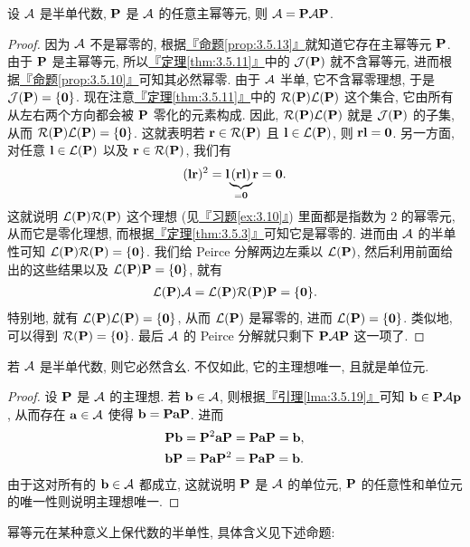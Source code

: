 \documentclass[lang=cn,zihao=-4,twoside,fontset=none]{textbook}
\newcommand{\undernote}[2]{\underset{#1}{\underbrace{#2}}}
\def\eq#1{\[\begin{aligned}{}#1\end{aligned}\]}
\newcommand{\propref}[1]{\hyperref[#1]{『命题\textnormal{\ref*{#1}}』}}
\newcommand{\thmref}[1]{\hyperref[#1]{『定理\textnormal{\ref*{#1}}』}}
\newcommand{\lmaref}[1]{\hyperref[#1]{『引理\textnormal{\ref*{#1}}』}}
\newcommand{\exref}[1]{\hyperref[#1]{『习题\textnormal{\ref*{#1}}』}}
\newcommand{\set}[1]{\{#1\}}
\newcommand{\bfnull}{\mathbf{0}}
\begin{document}
\begin{lem}
    \label{lma:3.5.19}%
    设 ${\mathcal A}$ 是半单代数, ${\mathbf P}$ 是 ${\mathcal A}$ 的任意主幂等元, 则 ${\mathcal A}={\mathbf P}{\mathcal A}{\mathbf P}$.
\end{lem}
\begin{proof}
    因为 ${\mathcal A}$ 不是幂零的, 根据\propref{prop:3.5.13}就知道它存在主幂等元 ${\mathbf P}$. 由于 ${\mathbf P}$ 是主幂等元, 所以\thmref{thm:3.5.11}中的 ${\mathcal J}({\mathbf P})$ 就不含幂等元, 进而根据\propref{prop:3.5.10}可知其必然幂零. 由于 ${\mathcal A}$ 半单, 它不含幂零理想, 于是 $\mJ(\bfP)=\set{\bfnull}$. 现在注意\thmref{thm:3.5.11}中的 ${\mathcal R}({\mathbf P}){\mathcal L}({\mathbf P})$ 这个集合, 它由所有从左右两个方向都会被 ${\mathbf P}$ 零化的元素构成. 因此, ${\mathcal R}({\mathbf P}){\mathcal L}({\mathbf P})$ 就是 ${\mathcal J}({\mathbf P})$ 的子集, 从而 $\mR(\bfP)\mL(\bfP)=\set{\bfnull}$. 这就表明若 ${\mathbf r}\in{\mathcal R}({\mathbf P})$ 且 ${\mathbf l}\in{\mathcal L}({\mathbf P})$, 则 $\bfr\bfl=\bfnull$. 另一方面, 对任意 ${\mathbf l}\in{\mathcal L}({\mathbf P})$ 以及 ${\mathbf r}\in{\mathcal R}({\mathbf P})$, 我们有 
    \eq{
        (\bfl\bfr)^2=\bfl\undernote{=\bfnull}{(\bfr\bfl)}\bfr=\bfnull.
    }
    这就说明 ${\mathcal L}({\mathbf P}){\mathcal R}({\mathbf P})$ 这个理想 (见\exref{ex:3.10}) 里面都是指数为 $2$ 的幂零元, 从而它是零化理想, 而根据\thmref{thm:3.5.3}可知它是幂零的. 进而由 ${\mathcal A}$ 的半单性可知 $\mL(\bfP)\mR(\bfP)=\set{\bfnull}$. 我们给 Peirce 分解两边左乘以 ${\mathcal L}({\mathbf P})$, 然后利用前面给出的这些结果以及 $\mL(\bfP)\bfP=\set{\bfnull}$, 就有 
    \eq{
        \mL(\bfP)\mA=\mL(\bfP)\mR(\bfP)\bfP=\set{\bfnull}.
    }
    特别地, 就有 $\mL(\bfP)\mL(\bfP)=\set{\bfnull}$, 从而 ${\mathcal L}({\mathbf P})$ 是幂零的, 进而 $\mL(\bfP)=\set{\bfnull}$. 类似地, 可以得到 $\mR(\bfP)=\set{\bfnull}$. 最后 ${\mathcal A}$ 的 Peirce 分解就只剩下 ${\mathbf P}{\mathcal A}{\mathbf P}$ 这一项了.
\end{proof}

\begin{theorem}
    \label{thm:3.5.20}%
    若 ${\mathcal A}$ 是半单代数, 则它必然含幺. 不仅如此, 它的主理想唯一, 且就是单位元.
\end{theorem}

\begin{proof}
    设 ${\mathbf P}$ 是 ${\mathcal A}$ 的主理想. 若 ${\mathbf b}\in{\mathcal A}$, 则根据\lmaref{lma:3.5.19}可知 ${\mathbf b}\in{\mathbf P}{\mathcal A}{\mathbf p}$, 从而存在 ${\mathbf a}\in{\mathcal A}$ 使得 ${\mathbf b}={\mathbf P}{\mathbf a}{\mathbf P}$. 进而  
    \eq{
        \bfP\bfb&=\bfP^2\bfa\bfP=\bfP\bfa\bfP=\bfb,\\
        \bfb\bfP&=\bfP\bfa\bfP^2=\bfP\bfa\bfP=\bfb.
    }
    由于这对所有的 ${\mathbf b}\in{\mathcal A}$ 都成立, 这就说明 ${\mathbf P}$ 是 ${\mathcal A}$ 的单位元, ${\mathbf P}$ 的任意性和单位元的唯一性则说明主理想唯一.
\end{proof}

幂等元在某种意义上保代数的半单性, 具体含义见下述命题:
\end{document}
